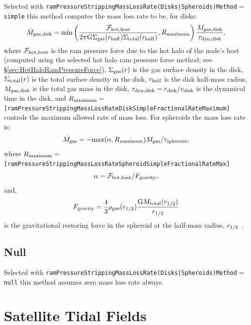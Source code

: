 Selected with {\tt ramPressureStrippingMassLossRate(Disks|Spheroids)Method}$=${\tt simple} this method computes the mass loss rate to be, for disks:
\begin{equation}
 \dot{M}_{\rm gas, disk} = \hbox{min}\left({\mathcal{F}_{\rm hot, host} \over 2 \pi {\rm G} \Sigma_{\rm gas}(r_{\rm half}) \Sigma_{\rm total}(r_{\rm half})}, R_{\rm maximum}\right) {M_{\rm gas, disk} \over \tau_{\rm dyn, disk}},
\end{equation}
where $\mathcal{F}_{\rm hot, host}$ is the ram pressure force due to the hot halo of the node's host (computed using the selected hot halo ram pressure force method; see \S\ref{sec:HotHaloRamPressureForce}), $\Sigma_{\rm gas}(r)$ is the gas surface density in the disk, $\Sigma_{\rm total}(r)$ is the total surface density in the disk, $r_{\rm half}$ is the disk half-mass radius, $M_{\rm gas, disk}$ is the total gas mass in the disk, $\tau_{\rm dyn, disk} = r_{\rm disk}/v_{\rm disk}$ is the dynamical time in the disk, and $R_{\rm maximum}=${\tt [ramPressureStrippingMassLossRateDiskSimpleFractionalRateMaximum]} controls the maximum allowed rate of mass loss. For spheroids the mass loss rate is:
\begin{equation}
\dot{M}_{\rm gas} = -\hbox{max}(\alpha,R_{\rm maximum}) M_{\rm gas}/\tau_{\rm spheroid},
\end{equation}
where $R_{\rm maximum}=${\tt [ramPressureStrippingMassLossRateSpheroidSimpleFractionalRateMax]}
\begin{equation}
\alpha = \mathcal{F}_{\rm hot,host}/F_{\rm gravity},
\end{equation}
and,
\begin{equation}
F_{\rm gravity} = {4\over 3} \rho_{\rm gas}(r_{1/2}) {{\rm G} M_{\rm total}(r_{1/2})\over r_{1/2}}
\end{equation}
is the gravitational restoring force in the spheroid at the half-mass radius, $r_{\rm 1/2}$ \citep{takeda_ram_1984}.


\subsection{Null}

Selected with {\tt ramPressureStrippingMassLossRate(Disks|Spheroids)Method}$=${\tt null} this method assumes zero mass loss rate always.

\section{Satellite Tidal Fields}\label{sec:SatelliteTidalFields}

